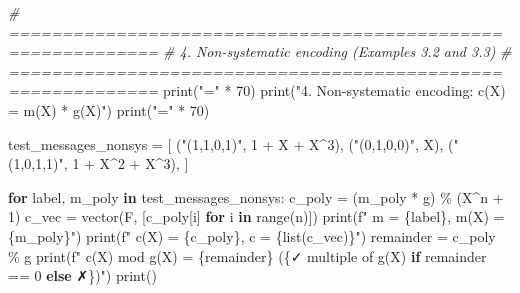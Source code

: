 \documentclass[
]{article}
\newenvironment{Shaded}{}{}
\newcommand{\BuiltInTok}[1]{\textcolor[rgb]{0.00,0.50,0.00}{#1}}
\newcommand{\CommentTok}[1]{\textcolor[rgb]{0.38,0.63,0.69}{\textit{#1}}}
\newcommand{\ControlFlowTok}[1]{\textcolor[rgb]{0.00,0.44,0.13}{\textbf{#1}}}
\newcommand{\DecValTok}[1]{\textcolor[rgb]{0.25,0.63,0.44}{#1}}
\newcommand{\KeywordTok}[1]{\textcolor[rgb]{0.00,0.44,0.13}{\textbf{#1}}}
\newcommand{\NormalTok}[1]{#1}
\newcommand{\OperatorTok}[1]{\textcolor[rgb]{0.40,0.40,0.40}{#1}}
\newcommand{\SpecialCharTok}[1]{\textcolor[rgb]{0.25,0.44,0.63}{#1}}
\newcommand{\SpecialStringTok}[1]{\textcolor[rgb]{0.73,0.40,0.53}{#1}}
\newcommand{\StringTok}[1]{\textcolor[rgb]{0.25,0.44,0.63}{#1}}
\begin{document}
\begin{Shaded}
\begin{Highlighting}[]
\CommentTok{\# ============================================================}
\CommentTok{\# 4. Non{-}systematic encoding (Examples 3.2 and 3.3)}
\CommentTok{\# ============================================================}
\BuiltInTok{print}\NormalTok{(}\StringTok{"="} \OperatorTok{*} \DecValTok{70}\NormalTok{)}
\BuiltInTok{print}\NormalTok{(}\StringTok{"4. Non{-}systematic encoding: c(X) = m(X) * g(X)"}\NormalTok{)}
\BuiltInTok{print}\NormalTok{(}\StringTok{"="} \OperatorTok{*} \DecValTok{70}\NormalTok{)}

\NormalTok{test\_messages\_nonsys }\OperatorTok{=}\NormalTok{ [}
\NormalTok{    (}\StringTok{"(1,1,0,1)"}\NormalTok{, }\DecValTok{1} \OperatorTok{+}\NormalTok{ X }\OperatorTok{+}\NormalTok{ X}\OperatorTok{\^{}}\DecValTok{3}\NormalTok{),}
\NormalTok{    (}\StringTok{"(0,1,0,0)"}\NormalTok{, X),}
\NormalTok{    (}\StringTok{"(1,0,1,1)"}\NormalTok{, }\DecValTok{1} \OperatorTok{+}\NormalTok{ X}\OperatorTok{\^{}}\DecValTok{2} \OperatorTok{+}\NormalTok{ X}\OperatorTok{\^{}}\DecValTok{3}\NormalTok{),}
\NormalTok{]}

\ControlFlowTok{for}\NormalTok{ label, m\_poly }\KeywordTok{in}\NormalTok{ test\_messages\_nonsys:}
\NormalTok{    c\_poly }\OperatorTok{=}\NormalTok{ (m\_poly }\OperatorTok{*}\NormalTok{ g) }\OperatorTok{\%}\NormalTok{ (X}\OperatorTok{\^{}}\NormalTok{n }\OperatorTok{+} \DecValTok{1}\NormalTok{)}
\NormalTok{    c\_vec }\OperatorTok{=}\NormalTok{ vector(F, [c\_poly[i] }\ControlFlowTok{for}\NormalTok{ i }\KeywordTok{in} \BuiltInTok{range}\NormalTok{(n)])}
    \BuiltInTok{print}\NormalTok{(}\SpecialStringTok{f"  m = }\SpecialCharTok{\{}\NormalTok{label}\SpecialCharTok{\}}\SpecialStringTok{,  m(X) = }\SpecialCharTok{\{}\NormalTok{m\_poly}\SpecialCharTok{\}}\SpecialStringTok{"}\NormalTok{)}
    \BuiltInTok{print}\NormalTok{(}\SpecialStringTok{f"  c(X) = }\SpecialCharTok{\{}\NormalTok{c\_poly}\SpecialCharTok{\}}\SpecialStringTok{,  c = }\SpecialCharTok{\{}\BuiltInTok{list}\NormalTok{(c\_vec)}\SpecialCharTok{\}}\SpecialStringTok{"}\NormalTok{)}
\NormalTok{    remainder }\OperatorTok{=}\NormalTok{ c\_poly }\OperatorTok{\%}\NormalTok{ g}
    \BuiltInTok{print}\NormalTok{(}\SpecialStringTok{f"  c(X) mod g(X) = }\SpecialCharTok{\{}\NormalTok{remainder}\SpecialCharTok{\}}\SpecialStringTok{  (}\SpecialCharTok{\{}\StringTok{\textquotesingle{}✓ multiple of g(X)\textquotesingle{}} \ControlFlowTok{if}\NormalTok{ remainder }\OperatorTok{==} \DecValTok{0} \ControlFlowTok{else} \StringTok{\textquotesingle{}✗\textquotesingle{}}\SpecialCharTok{\}}\SpecialStringTok{)"}\NormalTok{)}
    \BuiltInTok{print}\NormalTok{()}


\end{Highlighting}
\end{Shaded}
\end{document}
